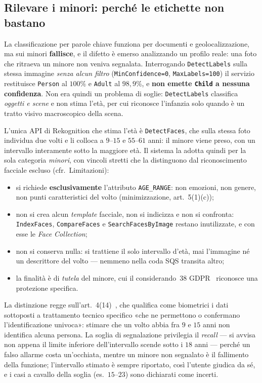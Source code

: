 \documentclass[11pt,a4paper]{article}
\begin{document}
\subsection{Rilevare i minori: perché le etichette non bastano}\label{sec:minori}
La classificazione per parole chiave funziona per documenti e geolocalizzazione, ma sui
minori \textbf{fallisce}, e il difetto è emerso analizzando un profilo reale: una foto che
ritraeva un minore non veniva segnalata. Interrogando \texttt{DetectLabels} sulla stessa
immagine \emph{senza alcun filtro} (\texttt{MinConfidence=0}, \texttt{MaxLabels=100}) il
servizio restituisce \texttt{Person} al $100\%$ e \texttt{Adult} al $98{,}9\%$, e
\textbf{non emette \texttt{Child} a nessuna confidenza}. Non era quindi un problema di
soglie: \texttt{DetectLabels} classifica \emph{oggetti e scene} e non stima l'età, per cui
riconosce l'infanzia solo quando è un tratto visivo macroscopico della scena.

L'unica API di Rekognition che stima l'età è \texttt{DetectFaces}, che sulla stessa foto
individua due volti e li colloca a $9$--$15$ e $55$--$61$ anni: il minore viene preso, con
un intervallo interamente sotto la maggiore età. Il sistema la adotta quindi per la sola
categoria \emph{minori}, con vincoli stretti che la distinguono dal riconoscimento
facciale escluso (cfr.\ Limitazioni):
\begin{itemize}[nosep]
  \item si richiede \textbf{esclusivamente} l'attributo \texttt{AGE\_RANGE}: non emozioni,
        non genere, non punti caratteristici del volto (minimizzazione, art.~5(1)(c));
  \item non si crea alcun \emph{template} facciale, non si indicizza e non si confronta:
        \texttt{IndexFaces}, \texttt{CompareFaces} e \texttt{SearchFacesByImage} restano
        inutilizzate, e con esse le \emph{Face Collection};
  \item non si conserva nulla: si trattiene il solo intervallo d'età, mai l'immagine né un
        descrittore del volto --- nemmeno nella coda SQS transita altro;
  \item la finalità è di \emph{tutela} del minore, cui il considerando~38 GDPR~\cite{gdpr} riconosce
        una protezione specifica.
\end{itemize}
La distinzione regge sull'art.~4(14)~\cite{gdpr}, che qualifica come biometrici i dati sottoposti a
trattamento tecnico specifico «che ne permettono o confermano l'identificazione univoca»:
stimare che un volto abbia fra $9$ e $15$ anni non identifica alcuna persona. La soglia di
segnalazione privilegia il \emph{recall} --- si avvisa non appena il limite inferiore
dell'intervallo scende sotto i $18$ anni --- perché un falso allarme costa un'occhiata,
mentre un minore non segnalato è il fallimento della funzione; l'intervallo stimato è
sempre riportato, così l'utente giudica da sé, e i casi a cavallo della soglia
(es.\ $15$--$23$) sono dichiarati come incerti.
\end{document}
